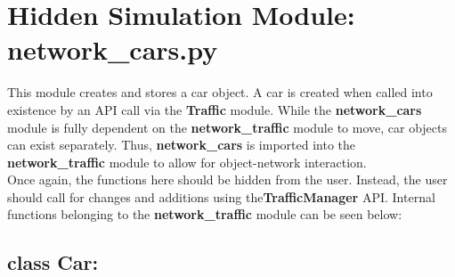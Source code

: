 \section{Hidden Simulation Module: network\_cars.py}

\par This module creates and stores a car object.  A car is created when called into existence by an API call via the \textbf{Traffic} module.  While the \textbf{network\_cars} module is fully dependent on the \textbf{network\_traffic} module to move, car objects can exist separately.  Thus,  \textbf{network\_cars} is imported into the \textbf{network\_traffic} module to allow for object-network interaction. \\

\noindent Once again, the functions here should be hidden from the user.  Instead, the user should call for changes and additions using the\textbf{TrafficManager} API.  Internal functions belonging to the \textbf{network\_traffic} module can be seen below:


\subsection{class Car:}

